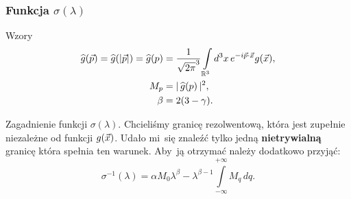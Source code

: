 \documentclass[10pt,t]{beamer}
\begin{document}
\begin{frame}
  \frametitle{Funkcja $\sigma( \lambda )$}


  Wzory
  \begin{subequations}
    \begin{align}
      \label{eq:Efekt-Casimira-32-A}
      \widehat{g}( \vec{ p } ) = \widehat{g}( | \vec{ p } | ) = \widehat{g}( p )
      &=
        \frac{ 1 }{ \sqrt{ 2 \pi }^{ 3 } }
        \int\limits_{ \mathbb{R}^{ 3 } } d^{ 3 } x \, e^{ -i \vec{ p } \cdot \vec{ x } } g( \vec{ x } ), \\
      \label{eq:Efekt-Casimira-32-B}
      M_{ p } &= |\, {  \widehat{g}( p )  } \,|^{ 2 }, \\
      \label{eq:Efekt-Casimira-32-C}
      \beta &= 2( 3 - \gamma ).
    \end{align}
  \end{subequations}


  Zagadnienie funkcji $\sigma( \lambda )$. Chcieliśmy granicę rezolwentową, która
  jest zupełnie niezależne od funkcji $g( \vec{ x } )$. Udało mi~się znaleźć
  tylko jedną \textbf{nietrywialną} granicę która spełnia ten warunek.
  Aby~ją otrzymać należy dodatkowo przyjąć:
  \begin{equation}
    \label{eq:Efekt-Casimira-33}
    \sigma^{ -1 }( \lambda ) =
    \alpha M_{ 0 } \lambda^{ \beta } - \lambda^{ \beta - 1 } \int\limits_{ -\infty }^{ +\infty } M_{ q } \, dq.
  \end{equation}

\end{frame}
\end{document}
